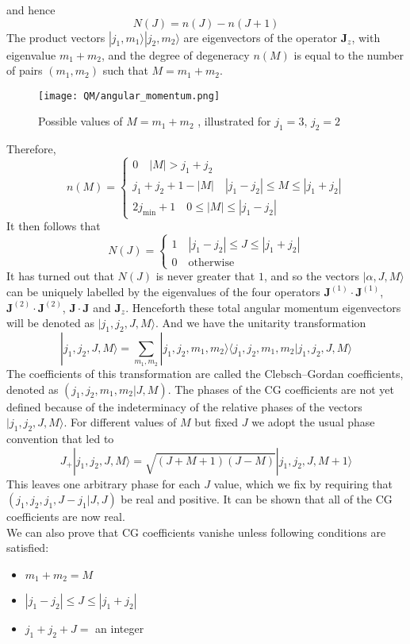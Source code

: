 and hence
\[N(J) = n(J) - n(J+1)\]
The product vectors $|j_1,m_1\rangle |j_2,m_2\rangle$ are eigenvectors of the operator $\bm{J}_z$, with eigenvalue $m_1+m_2$, and the degree of degeneracy $n(M)$ is equal to the number of pairs $(m_1,m_2)$ such that $M=m_1+m_2$.
\begin{figure}[!h]
	\centering
	\texttt{[image: QM/angular\_momentum.png]}
	\caption{Possible values of $M=m_1+m_2$ , illustrated for $j_1=3$, $j_2=2$}
\end{figure}
Therefore,
\[n(M)=\begin{cases} 0 \quad |M| > j_1 + j_2\\ j_1+j_2+1-|M|\quad |j_1-j_2| \leq M \leq |j_1+j_2|\\ 2j_{\mathrm{min}}+1 \quad 0 \leq |M|\leq |j_1-j_2|\end{cases} \]
It then follows that
\[N(J)=\begin{cases} 1 \quad |j_1-j_2| \leq J \leq |j_1+j_2|\\ 0 \quad \mbox{otherwise}\end{cases} \]
It has turned out that $N(J)$ is never greater that $1$, and so the vectors $|\alpha, J, M \rangle$ can be uniquely labelled by the eigenvalues of the four operators $\bm{J}^{(1)}\cdot\bm{J}^{(1)}$, $\bm{J}^{(2)}\cdot\bm{J}^{(2)}$, $\bm{J}\cdot\bm{J}$ and $\bm{J}_z$. Henceforth these total angular momentum
eigenvectors will be denoted as $|j_1,j_2,J,M\rangle$. And we have the unitarity transformation 
\[|j_1,j_2,J,M\rangle = \sum_{m_1,m_2} |j_1,j_2,m_1,m_2\rangle \langle j_1,j_2,m_1,m_2 | j_1,j_2,J,M\rangle\]
The coefficients of this transformation are called the Clebsch–Gordan coefficients, denoted as $(j_1,j_2,m_1,m_2|J,M)$.
The phases of the CG coefficients are not yet defined because of the indeterminacy of the relative phases of the vectors $|j_1,j_2,J,M\rangle$. For different values of $M$ but fixed $J$ we adopt the usual phase convention that led to
\[J_+ |j_1,j_2,J,M\rangle = \sqrt{(J+M+1)(J-M)} |j_1,j_2,J,M+1\rangle\]
This leaves one arbitrary phase for each $J$ value, which we fix by requiring that $(j_1,j_2,j_1,J-j_1|J,J)$ be real and positive. It can be shown that all of the CG coefficients are now real.\\
We can also prove that CG coefficients vanishe unless following conditions are satisfied:
\begin{itemize}
\item $m_1+m_2=M$
\item $|j_1-j_2| \leq J \leq |j_1+j_2|$
\item $j_1+j_2+J =$ an integer
\end{itemize}
